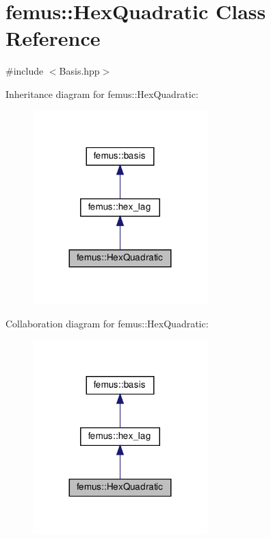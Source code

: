 \hypertarget{classfemus_1_1_hex_quadratic}{}\section{femus\+:\+:Hex\+Quadratic Class Reference}
\label{classfemus_1_1_hex_quadratic}


{\ttfamily \#include $<$Basis.\+hpp$>$}



Inheritance diagram for femus\+:\+:Hex\+Quadratic\+:
\nopagebreak
\begin{figure}[H]
\begin{center}
\leavevmode
\includegraphics[width=191pt]{classfemus_1_1_hex_quadratic__inherit__graph}
\end{center}
\end{figure}


Collaboration diagram for femus\+:\+:Hex\+Quadratic\+:
\nopagebreak
\begin{figure}[H]
\begin{center}
\leavevmode
\includegraphics[width=191pt]{classfemus_1_1_hex_quadratic__coll__graph}
\end{center}
\end{figure}
